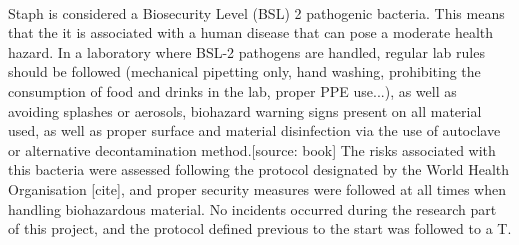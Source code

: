 \paragraph{}Staph is considered a Biosecurity Level (BSL) 2 pathogenic bacteria. This means that the it is associated with a human disease that can pose a moderate health hazard. In a laboratory where BSL-2 pathogens are handled, regular lab rules should be followed (mechanical pipetting only, hand washing, prohibiting the consumption of food and drinks in the lab, proper PPE use...), as well as avoiding splashes or aerosols, biohazard warning signs present on all material used, as well as proper surface and material disinfection via the use of autoclave or alternative decontamination method.[source: book] The risks associated with this bacteria were assessed following the protocol designated by the World Health Organisation [cite], and proper security measures were followed at all times when handling biohazardous material. No incidents occurred during the research part of this project, and the protocol defined previous to the start was followed to a T.



